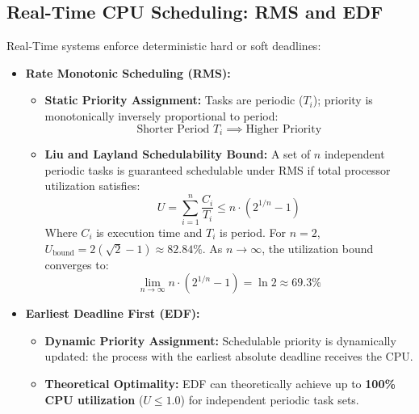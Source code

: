 \subsection{Real-Time CPU Scheduling: RMS and EDF}
Real-Time systems enforce deterministic hard or soft deadlines:
\begin{itemize}
    \item \textbf{Rate Monotonic Scheduling (RMS):}
    \begin{itemize}
        \item \textbf{Static Priority Assignment:} Tasks are periodic ($T_i$); priority is monotonically inversely proportional to period:
        \begin{equation}
        \text{Shorter Period } T_i \implies \text{Higher Priority}
        \end{equation}
        \item \textbf{Liu and Layland Schedulability Bound:} A set of $n$ independent periodic tasks is guaranteed schedulable under RMS if total processor utilization satisfies:
        \begin{equation}
        \boxed{U = \sum_{i=1}^{n} \frac{C_i}{T_i} \le n \cdot (2^{1/n} - 1)}
        \end{equation}
        Where $C_i$ is execution time and $T_i$ is period. For $n = 2$, $U_{\text{bound}} = 2(\sqrt{2} - 1) \approx \mathbf{82.84\%}$. As $n \to \infty$, the utilization bound converges to:
        \begin{equation}
        \lim_{n \to \infty} n \cdot (2^{1/n} - 1) = \ln 2 \approx \mathbf{69.3\%}
        \end{equation}
    \end{itemize}
    \item \textbf{Earliest Deadline First (EDF):}
    \begin{itemize}
        \item \textbf{Dynamic Priority Assignment:} Schedulable priority is dynamically updated: the process with the earliest absolute deadline receives the CPU.
        \item \textbf{Theoretical Optimality:} EDF can theoretically achieve up to \textbf{100\% CPU utilization} ($U \le 1.0$) for independent periodic task sets.
    \end{itemize}
\end{itemize}



